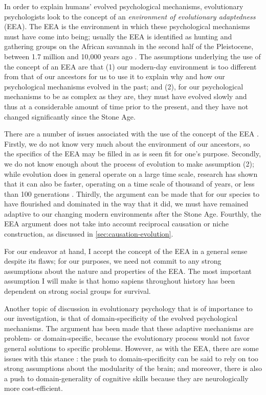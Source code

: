 In order to explain humans' evolved psychological mechanisms, evolutionary psychologists look to the concept of an \emph{environment of evolutionary adaptedness} (EEA). The EEA is the environment in which these psychological mechanisms must have come into being; usually the EEA is identified as hunting and gathering groups on the African savannah in the second half of the Pleistocene, between 1.7 million and 10,000 years ago \citep{LB02}.
The assumptions underlying the use of the concept of an EEA are that (1) our modern-day environment is too different from that of our ancestors for us to use it to explain why and how our psychological mechanisms evolved in the past; and (2), for our psychological mechanisms to be as complex as they are, they must have evolved slowly and thus at a considerable amount of time prior to the present, and they have not changed significantly since the Stone Age.

There are a number of issues associated with the use of the concept of the EEA \citep{LB02}. Firstly, we do not know very much about the environment of our ancestors, so the specifics of the EEA may be filled in as is seen fit for one's purpose. Secondly, we do not know enough about the process of evolution to make assumption (2); while evolution does in general operate on a large time scale, research has shown that it can also be faster, operating on a time scale of thousand of years, or less than 100 generations \citep[pp.~190--191 and references therein]{LB02}. Thirdly, the argument can be made that for our species to have flourished and dominated in the way that it did, we must have remained adaptive to our changing modern environments after the Stone Age. Fourthly, the EEA argument does not take into account reciprocal causation or niche construction, as discussed in \cref{sec:causation-evolution}.

For our endeavor at hand, I accept the concept of the EEA in a general sense despite its flaws; for our purposes, we need not commit to any strong assumptions about the nature and properties of the EEA. The most important assumption I will make is that homo sapiens throughout history has been dependent on strong social groups for survival.

Another topic of discussion in evolutionary psychology that is of importance to our investigation, is that of domain-specificity of the evolved psychological mechanisms. The argument has been made \citep[p.~50]{Buss15} that these adaptive mechanisms are problem- or domain-specific, because the evolutionary process would not favor general solutions to specific problems.
However, as with the EEA, there are some issues with this stance \citep{LB02}: the push to domain-specificity can be said to rely on too strong assumptions about the modularity of the brain; and moreover, there is also a push to domain-generality of cognitive skills because they are neurologically more cost-efficient.

